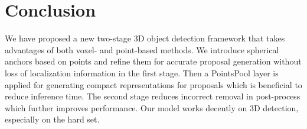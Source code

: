 \documentclass[10pt,twocolumn,letterpaper]{article}
\begin{document}
\section{Conclusion}
We have proposed a new two-stage 3D object detection framework that takes advantages of both voxel- and point-based methods. We introduce spherical anchors based on points and refine them for accurate proposal generation without loss of localization information in the first stage. Then a PointsPool layer is applied for generating compact representations for proposals which is beneficial to reduce inference time. The second stage reduces incorrect removal in post-process which further improves performance. Our model works decently on 3D detection, especially on the hard set. 



{\small


}
\end{document}

